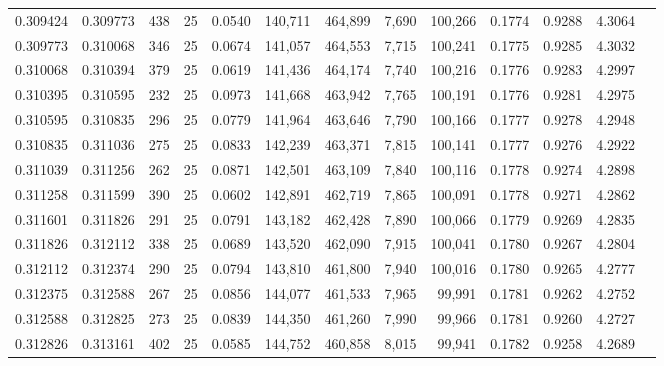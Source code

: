 \begin{tabular}{rrrrrrrrrrrrr}
0.309424 & 0.309773 &   438 &  25 &                                     0.0540 & 140,711 & 464,899 &   7,690 & 100,266 & 0.1774 & 0.9288 & 4.3064 \\
0.309773 & 0.310068 &   346 &  25 &                                     0.0674 & 141,057 & 464,553 &   7,715 & 100,241 & 0.1775 & 0.9285 & 4.3032 \\
0.310068 & 0.310394 &   379 &  25 &                                     0.0619 & 141,436 & 464,174 &   7,740 & 100,216 & 0.1776 & 0.9283 & 4.2997 \\
0.310395 & 0.310595 &   232 &  25 &                                     0.0973 & 141,668 & 463,942 &   7,765 & 100,191 & 0.1776 & 0.9281 & 4.2975 \\
0.310595 & 0.310835 &   296 &  25 &                                     0.0779 & 141,964 & 463,646 &   7,790 & 100,166 & 0.1777 & 0.9278 & 4.2948 \\
0.310835 & 0.311036 &   275 &  25 &                                     0.0833 & 142,239 & 463,371 &   7,815 & 100,141 & 0.1777 & 0.9276 & 4.2922 \\
0.311039 & 0.311256 &   262 &  25 &                                     0.0871 & 142,501 & 463,109 &   7,840 & 100,116 & 0.1778 & 0.9274 & 4.2898 \\
0.311258 & 0.311599 &   390 &  25 &                                     0.0602 & 142,891 & 462,719 &   7,865 & 100,091 & 0.1778 & 0.9271 & 4.2862 \\
0.311601 & 0.311826 &   291 &  25 &                                     0.0791 & 143,182 & 462,428 &   7,890 & 100,066 & 0.1779 & 0.9269 & 4.2835 \\
0.311826 & 0.312112 &   338 &  25 &                                     0.0689 & 143,520 & 462,090 &   7,915 & 100,041 & 0.1780 & 0.9267 & 4.2804 \\
0.312112 & 0.312374 &   290 &  25 &                                     0.0794 & 143,810 & 461,800 &   7,940 & 100,016 & 0.1780 & 0.9265 & 4.2777 \\
0.312375 & 0.312588 &   267 &  25 &                                     0.0856 & 144,077 & 461,533 &   7,965 &  99,991 & 0.1781 & 0.9262 & 4.2752 \\
0.312588 & 0.312825 &   273 &  25 &                                     0.0839 & 144,350 & 461,260 &   7,990 &  99,966 & 0.1781 & 0.9260 & 4.2727 \\
0.312826 & 0.313161 &   402 &  25 &                                     0.0585 & 144,752 & 460,858 &   8,015 &  99,941 & 0.1782 & 0.9258 & 4.2689 \\

\end{tabular}
